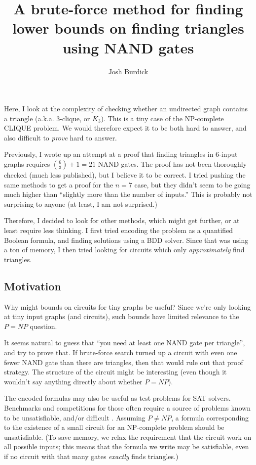 \documentclass[12pt]{article}
\begin{document}
\title{A brute-force method for finding lower bounds on finding triangles using NAND gates}
\author{Josh Burdick}
\maketitle

Here, I look at the complexity of checking whether an undirected
graph contains a triangle (a.k.a. 3-clique, or $K_3$).
This is a tiny case of the NP-complete
CLIQUE problem. We would therefore expect it to be both hard to answer, and also difficult
to {\em prove} hard to answer.

Previously, I wrote up an attempt at a proof that
finding triangles in 6-input graphs requires
${6 \choose 3} + 1 = 21$ NAND gates.
The proof has not been thoroughly checked (much less
published), but I believe it to be correct.
I tried pushing the same methods to get a proof for the
$n=7$ case, but they didn't seem to be going much higher
than ``slightly more than the number of inputs.'' 
This is probably not surprising to anyone (at least,
I am not surprised.)

Therefore, I decided to look for other methods, which
might get further, or at least require less thinking.
I first tried encoding the problem
as a quantified Boolean formula, and finding solutions
using a BDD solver. Since that was using a ton of memory,
I then tried looking for circuits which only {\em approximately}
find triangles.

\subsection{Motivation}

Why might bounds on circuits for tiny graphs be useful? Since we're
only looking at tiny input graphs (and circuits), such bounds have
limited relevance to the $P=NP$ question.

It seems natural to guess that ``you need at least one NAND gate per triangle'',
and try to prove that.
If brute-force search turned up a circuit with even one fewer NAND gate
than there are triangles,
then that would rule out that proof strategy.
The structure of the circuit might be interesting (even though it wouldn't
say anything directly about whether $P=NP$).

The encoded formulas may also be useful as test problems for SAT solvers.
Benchmarks and competitions for those often require a source of
problems known to be unsatisfiable, and/or difficult \cite{toughsat}.
 Assuming $P \ne NP$,
a formula corresponding to the existence of a small circuit for an NP-complete
problem should be unsatisfiable. (To save memory, we relax the requirement
that the circuit work on all possible inputs; this means that the formula we
write may be satisfiable, even if no circuit with that many gates {\em exactly}
finds triangles.)
\end{document}
